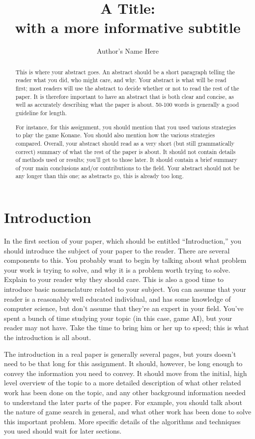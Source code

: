\documentclass[12pt,letterpaper]{article}
\title{A Title: \\ with a more informative subtitle}
\author{Author's Name Here}
\begin{document}
\maketitle

\begin{abstract}
This is where your abstract goes.  An abstract should be a short paragraph
telling the reader what you did, who might care, and why.  Your abstract is what
will be read first; most readers will use the abstract to decide whether or not
to read the rest of the paper.  It is therefore important to have an abstract
that is both clear and concise, as well as accurately describing what the paper
is about.  50-100 words is generally a good guideline for length.

For instance, for this assignment, you should mention that you used various
strategies to play the game Konane.  You should also mention
how the various strategies compared.  Overall, your abstract should read as a
very short (but still grammatically correct) summary of what the rest of the
paper is about.  It should not contain details of methods used or results;
you'll get to those later.  It should contain a brief summary of your main
conclusions and/or contributions to the field. Your abstract should not be any
longer than this one; as abstracts go, this is already too long.
\end{abstract}

\section{Introduction}
In the first section of your paper, which should be entitled ``Introduction,''
you should introduce the subject of your paper to the reader.  There are several
components to this.  You probably want to begin by talking about what problem
your work is trying to solve, and why it is a problem worth trying to solve.
Explain to your reader why they should care.  This is also a good time to
introduce basic nomenclature related to your subject.  You can assume that your
reader is a reasonably well educated individual, and has some knowledge of
computer science, but don't assume that they're an expert in your field.  You've
spent a bunch of time studying your topic (in this case, game AI), but
your reader may not have.  Take the time to bring him or her up to speed; this
is what the introduction is all about.

The introduction in a real paper is generally several pages, but yours doesn't
need to be that long for this assignment.  It should, however, be long enough to
convey the information you need to convey.  It should move from the initial, high level
overview of the topic to a more detailed description of what other related work
has been done on the topic, and any other background information needed to
understand the later parts of the paper.  For example, you should talk about the nature
of game search in general, and what other work has been
done to solve this important problem.  More specific details of the algorithms and
techniques you used should wait for later sections.
\end{document}
